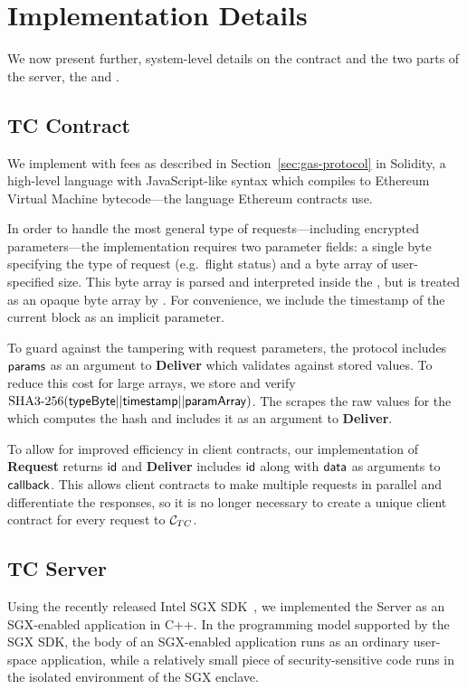 
\section{\tc Implementation Details}
\label{sec:impl}

We now present further, system-level details on the \tc contract \tcont and the two parts of the \tc server, the \encname and \medname.

\subsection{TC Contract} 

We implement \tcont with fees as described in Section~\ref{sec:gas-protocol} in Solidity,
a high-level language with JavaScript-like syntax which compiles to Ethereum Virtual Machine bytecode---the language Ethereum contracts use.

In order to handle the most general type of requests---including encrypted parameters---the \tcont implementation requires two parameter fields:
a single byte specifying the type of request (e.g.~flight status) and a byte array of user-specified size.
This byte array is parsed and interpreted inside the \encname, but is treated as an opaque byte array by \tcont.
For convenience, we include the timestamp of the current block as an implicit parameter.

To guard against the \medname tampering with request parameters, the \tcont protocol includes ${\sf params}$ as an argument to {\bf Deliver} which validates against stored values.
To reduce this cost for large arrays, we store and verify $\text{SHA3-256}({\sf typeByte} || {\sf timestamp} || {\sf paramArray})$.
The \medname scrapes the raw values for the \encname which computes the hash and includes it as an argument to {\bf Deliver}.

To allow for improved efficiency in client contracts, our implementation of {\bf Request} returns ${\sf id}$
and {\bf Deliver} includes ${\sf id}$ along with ${\sf data}$ as arguments to ${\sf callback}$.
This allows client contracts to make multiple requests in parallel and differentiate the responses,
so it is no longer necessary to create a unique client contract for every request to ${\cal C}_{TC}$.



\subsection{TC Server}
Using the recently released Intel SGX SDK~\cite{sgxsdk}, we implemented the \tc
Server as an SGX-enabled application in C++. In the programming model supported
by the SGX SDK, the body of an SGX-enabled application runs as an ordinary
user-space application, while a relatively small piece of security-sensitive
code runs in the isolated environment of the SGX enclave.


